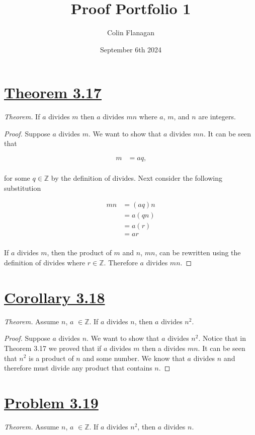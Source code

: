 \documentclass{article}
\title{Proof Portfolio 1}
\author{Colin Flanagan}
\date{September 6th 2024}
\begin{document}
\maketitle

\section*{\underline{Theorem 3.17} }
\textit{Theorem.} If $a$ divides $m$ then $a$ divides $mn$ where $a$, $m$, and $n$ are integers.
 \begin{proof}    
     Suppose $a$ divides $m$. We want to show that $a$ divides $mn$. It can be seen that
    
    \begin{align*}
        m &= aq\text{,} \\
    \end{align*}
    
     for some $q \in \mathbb{Z}$ by the definition of divides. Next consider the following substitution
    
    \begin{align*}
        mn &= (aq)n\nonumber \\
         &= a(qn) \\
         & = a(r)\\
         &= ar\\
    \end{align*}
    
    If $a$ divides $m$, then the product of $m$ and $n$, $mn$, can be rewritten using the definition of divides where $r \in \mathbb{Z}$. Therefore $a$ divides $mn$.
\end{proof}

\section*{\underline{Corollary 3.18}}
\textit{Theorem.} Assume $n$, $a$ $\in \mathbb{Z}$. If $a$ divides $n$, then $a$ divides $n^2$.
\begin{proof}
    Suppose $a$ divides $n$. We want to show that $a$ divides $n^2$. Notice that in Theorem 3.17 we proved that if $a$ divides $m$ then a divides $mn$. It can be seen that $n^2$ is a product of $n$ and some number. We know that $a$ divides $n$ and therefore must divide any product that contains $n$. 
\end{proof}





\section*{\underline{Problem 3.19} }
\textit{Theorem.} Assume $n$, $a$ $\in \mathbb{Z}$. If $a$ divides $n^2$, then $a$ divides $n$. \\
\end{document}
